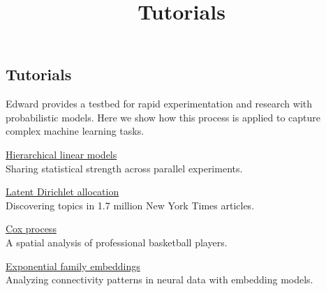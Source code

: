 \title{Tutorials}

\subsection{Tutorials}

Edward provides a testbed for rapid experimentation and research with
probabilistic models. Here we show how this process is applied to
capture complex machine learning tasks.



\href{#}{Hierarchical linear models} \\
Sharing statistical strength across parallel experiments.




\href{unsupervised}{Latent Dirichlet allocation} \\
Discovering topics in 1.7 million New York Times articles.

\href{#}{Cox process} \\
A spatial analysis of professional basketball players.

\href{#}{Exponential family embeddings} \\
Analyzing connectivity patterns in neural data with embedding models.




